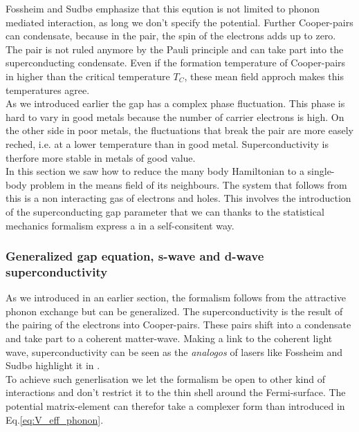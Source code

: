\documentclass[../main.tex]{subfile}
\begin{document}
Fossheim and Sudbø \cite{FossheimSudbo2004} emphasize that this eqution is not limited to phonon mediated interaction, as long we
don't specify the potential. Further Cooper-pairs can condensate, because in the pair, the spin of the electrons adds up to zero.
The pair is not ruled anymore by the Pauli principle and can take part into the superconducting condensate. 
Even if the formation temperature of Cooper-pairs in higher than the critical temperature $T_C$, these mean field approch makes this temperatures agree.\\

As we introduced earlier the gap has a complex phase fluctuation. This phase is hard to vary in good metals because the number of carrier electrons is high.
On the other side in poor metals, the fluctuations that break the pair are more easely reched, i.e. at a lower temperature than in good metal. Superconductivity
is therfore more stable in metals of good value.\\

In this section we saw how to reduce the many body Hamiltonian to a single-body problem in the means field of its neighbours. The system that follows from this
is a non interacting gas of electrons and holes. This involves the introduction of the 
superconducting gap parameter that we can thanks to the statistical mechanics formalism express a in a self-consitent way.


\subsubsection{Generalized gap equation, s-wave and d-wave superconductivity}
As we introduced in an earlier section, the formalism follows from the attractive phonon exchange but can be generalized. The superconductivity
is the result of the pairing of the electrons into Cooper-pairs. These pairs shift into a condensate and take part to a coherent matter-wave.
Making a link to the coherent light wave, superconductivity can be seen as the \textit{analogos} of lasers like Fossheim and Sudbø 
highlight it in \cite{FossheimSudbo2004}.\\

To achieve such generlisation we let the formalism be open to other kind of interactions and don't restrict it to the thin shell around the Fermi-surface.
The potential matrix-element can therefor take a complexer form than introduced in Eq.\ref{eq:V_eff_phonon}.\\
\end{document}
